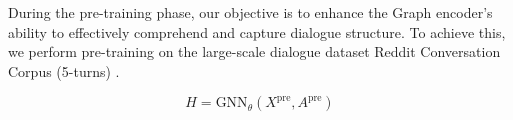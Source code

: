 \documentclass[letterpaper]{article} %
\begin{document}


During the pre-training phase, our objective is to enhance the Graph encoder's ability to effectively comprehend and capture dialogue structure. To achieve this, we perform pre-training on the large-scale dialogue dataset Reddit Conversation Corpus (5-turns) \cite{dziri-etal-2019-augmenting}. 

\begin{equation}\label{eq:gnn_pre_enc}
    H = \text{GNN}_{\theta}(X^{\text{pre}},A^{\text{pre}})
\end{equation}



\end{document}
